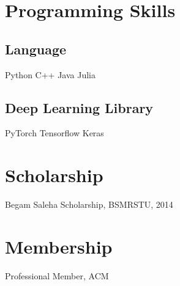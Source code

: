 \documentclass[]{deedy-resume-openfont}
\begin{document}
\begin{minipage}[t]{0.33\textwidth}




\section{Programming Skills}
\subsection{Language}
Python \textbullet{} C++ \textbullet{} Java \textbullet{} Julia \\
\subsection{Deep Learning Library}
PyTorch\textbullet{} Tensorflow \textbullet{} Keras
\sectionsep

\section{Scholarship}
Begam Saleha Scholarship, BSMRSTU, 2014
\sectionsep

\section{Membership}
Professional Member, ACM \\
\sectionsep


\end{minipage}
\end{document}
